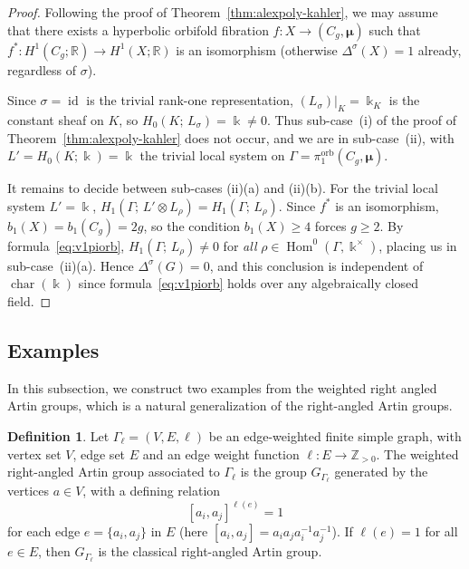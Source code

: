 \documentclass[11pt]{amsart}
\theoremstyle{definition}
\newtheorem{definition}[theorem]{Definition}
\newcommand{\Z}{\mathbb{Z}}
\newcommand{\R}{\mathbb{R}}
\renewcommand{\k}{\Bbbk}
\DeclareMathOperator{\id}{id}
\DeclareMathOperator{\ch}{char}
\DeclareMathOperator{\Hom}{{Hom}}
\DeclareMathOperator{\orb}{orb}
\begin{document}
\begin{proof}
Following the proof of Theorem~\ref{thm:alexpoly-kahler}, 
we may assume that there exists a hyperbolic orbifold fibration 
$f\colon X \to (C_g, \bm{\mu})$ such that 
$f^*\colon H^1(C_g;\R)\to H^1(X;\R)$ is an isomorphism 
(otherwise $\Delta^\sigma(X)=1$ already, regardless of $\sigma$).

Since $\sigma=\id$ is the trivial rank-one representation, 
$(L_\sigma)|_K = \k_K$ is the constant sheaf on $K$, so 
$H_0(K;\, L_\sigma) = \k \ne 0$. Thus sub-case~(i) 
of the proof of Theorem~\ref{thm:alexpoly-kahler} does not occur, 
and we are in sub-case~(ii), with $L' = H_0(K;\k) = \k$ 
the trivial local system on $\Gamma = \pi_1^{\orb}(C_g,\bm{\mu})$.

It remains to decide between sub-cases (ii)(a) and (ii)(b). 
For the trivial local system $L' = \k$, 
$H_1(\Gamma;\, L' \otimes L_\rho) = H_1(\Gamma;\, L_\rho)$. 
Since $f^*$ is an isomorphism, 
$b_1(X) = b_1(C_g) = 2g$, so the condition $b_1(X) \geq 4$ 
forces $g \geq 2$. By formula~\eqref{eq:v1piorb}, 
$H_1(\Gamma;\, L_\rho) \ne 0$ for \emph{all} 
$\rho \in \Hom^0(\Gamma, \k^\times)$, placing us in sub-case~(ii)(a). 
Hence $\Delta^\sigma(G) = 0$, and this conclusion is independent 
of $\ch(\k)$ since formula~\eqref{eq:v1piorb} holds over any 
algebraically closed field.
\end{proof}

\subsection{Examples}
\label{subsec:examples}

In this subsection, we construct two examples from the weighted right angled Artin groups, 
which is a natural generalization of the right-angled Artin groups.

\begin{definition}
\label{def:weighted RAAG}
Let $\Gamma_\ell= (V, E, \ell)$ be an edge-weighted finite simple graph, with 
vertex set $V$, edge set $E$  and an edge weight function $\ell \colon E \to \Z_{>0}$.
The weighted right-angled Artin group associated to  $\Gamma_\ell$ is the group 
$G_{\Gamma_\ell}$ generated by the vertices $a\in V$, with a defining relation
 \[
 [a_i,a_j]^{\ell(e)}=1
 \]
for each edge $e = \{a_i,a_j\}$ in $E$ (here $[a_i,a_j]=a_i a_j a_i^{-1}a_j^{-1}$). 
If $\ell(e)=1$ for all $e\in E$, then $G_{\Gamma_\ell}$ is the classical right-angled Artin group.
\end{definition}
\end{document}

